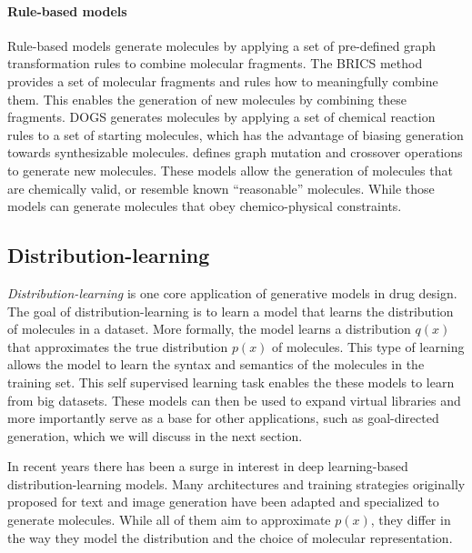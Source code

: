 \paragraph{Rule-based models}
Rule-based models generate molecules by applying a set of pre-defined graph transformation rules to
combine molecular fragments. The BRICS \citep{degenArtCompilingUsing2008} method provides a set of
molecular fragments and rules how to meaningfully combine them. This enables the generation of
new molecules by combining these fragments.
DOGS \citep{hartenfellerDOGSReactionDrivenNovo2012} generates molecules by applying a set of
chemical reaction rules to a set of starting molecules, which has the advantage of biasing
generation towards synthesizable molecules.\@ \citet{jensenGraphbasedGeneticAlgorithm2019} defines graph mutation
and crossover operations to generate new molecules. These models allow the generation of molecules that are chemically valid, or resemble known
``reasonable'' molecules. While those models can generate molecules that obey
chemico-physical constraints.



\subsection{Distribution-learning}
\emph{Distribution-learning} is one core application of generative models in drug design. The goal
of distribution-learning is to learn a model that learns the distribution of molecules in a dataset.
More formally, the model learns a distribution $q(x)$ that approximates the true distribution $p(x)$
of molecules. This type of learning allows the model to learn the syntax and semantics of the
molecules in the training set. This self supervised learning task enables the these models to learn
from big datasets. These models can then be used to expand virtual libraries and more importantly
serve as a base for other applications, such as goal-directed generation, which we will discuss in
the next section.

In recent years there has been a surge in interest in deep learning-based distribution-learning models.
Many architectures and training strategies originally proposed for text and image generation have
been adapted and specialized to generate molecules. While all of them aim to approximate $p(x)$, they
differ in the way they model the distribution and the choice of molecular representation.

